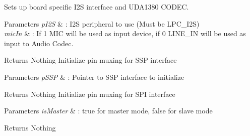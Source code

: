 Sets up board specific I2\+S interface and U\+D\+A1380 C\+O\+D\+E\+C. 


\begin{DoxyParams}{Parameters}
{\em p\+I2\+S} & \+: I2\+S peripheral to use (Must be L\+P\+C\+\_\+\+I2\+S) \\
\hline
{\em mic\+In} & \+: If 1 M\+I\+C will be used as input device, if 0 L\+I\+N\+E\+\_\+\+I\+N will be used as input to Audio Codec. \\
\hline
\end{DoxyParams}
\begin{DoxyReturn}{Returns}
Nothing Initialize pin muxing for S\+S\+P interface 
\end{DoxyReturn}

\begin{DoxyParams}{Parameters}
{\em p\+S\+S\+P} & \+: Pointer to S\+S\+P interface to initialize \\
\hline
\end{DoxyParams}
\begin{DoxyReturn}{Returns}
Nothing Initialize pin muxing for S\+P\+I interface 
\end{DoxyReturn}

\begin{DoxyParams}{Parameters}
{\em is\+Master} & \+: true for master mode, false for slave mode \\
\hline
\end{DoxyParams}
\begin{DoxyReturn}{Returns}
Nothing 
\end{DoxyReturn}
